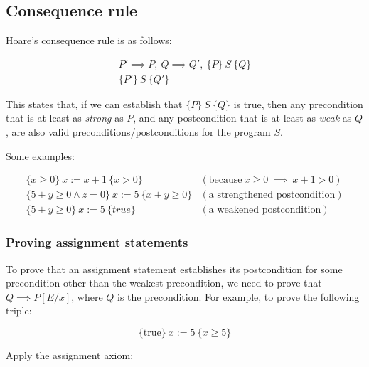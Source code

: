 \subsection{Consequence rule}

Hoare's consequence rule is as follows:

\begin{displaymath}
 \begin{array}{c}
   P' \implies P,~  Q \implies Q', ~\{P\} ~S~ \{Q\}\\
 \hline
 \{P'\} ~S~ \{Q'\}
 \end{array}
\end{displaymath}

This states that, if we can establish that \(\{P\} ~S~ \{Q\}\) is true, then any precondition that is at least as {\em strong} as \(P\), and any postcondition that is at least as {\em weak} as \(Q\), are also valid preconditions/postconditions for the program \(S\).

\begin{example}

Some examples:

\begin{displaymath}
\begin{array}{ll}
  \{x \geq 0\}~  x := x + 1~ \{x > 0\} & (\textrm{because}~ x \geq 0 ~\implies~ x + 1 > 0) \\
   \{5 + y \geq 0 \land z=0\}~ x := 5~ \{x + y \geq 0\} & (\textrm{a strengthened postcondition})\\
   \{5 + y \geq 0\}~ x := 5~ \{true\} & (\textrm{a weakened postcondition})
\end{array}
\end{displaymath}
\end{example}


\subsubsection*{Proving assignment statements}

To prove that an assignment statement establishes its postcondition for some precondition other than the weakest precondition, we need to prove that \(Q \implies P[E/x]\), where \(Q\) is the precondition. For example, to prove the following triple:

\begin{displaymath}
\{\textrm{true}\} ~x := 5~ \{x \geq 5\}
\end{displaymath}

Apply the assignment axiom:

